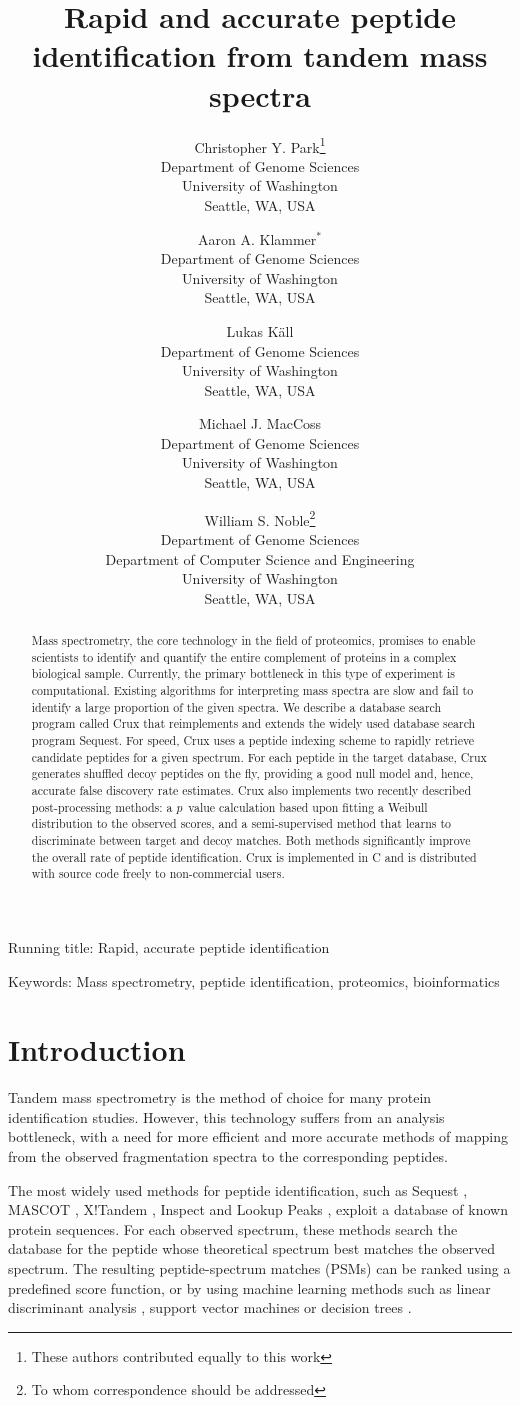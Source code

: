 \documentclass[12pt]{article}
\title{Rapid and accurate peptide identification from tandem mass spectra}
\author{Christopher Y. Park\footnote{These authors contributed equally 
to this work}\\
Department of Genome Sciences\\
University of Washington\\
Seattle, WA, USA
\and
Aaron A. Klammer$^*$\\
Department of Genome Sciences\\
University of Washington\\
Seattle, WA, USA
\and
Lukas K\"{a}ll\\
Department of Genome Sciences\\
University of Washington\\
Seattle, WA, USA
\and
Michael J. MacCoss\\
Department of Genome Sciences\\
University of Washington\\
Seattle, WA, USA
\and
William S. Noble\footnote{To whom correspondence should
  be addressed}\\
Department of Genome Sciences\\
Department of Computer Science and Engineering\\
University of Washington\\
Seattle, WA, USA
}
\begin{document}
\maketitle

\noindent Running title: {\sc Rapid, accurate peptide identification}

\noindent Keywords: Mass spectrometry, peptide identification, proteomics,
  bioinformatics

\clearpage

\begin{abstract}

\noindent
Mass spectrometry, the core technology in the field of proteomics,
promises to enable scientists to identify and quantify the entire
complement of proteins in a complex biological sample.  Currently, the
primary bottleneck in this type of experiment is computational.
Existing algorithms for interpreting mass spectra are slow and fail to
identify a large proportion of the given spectra.  We describe a
database search program called Crux that reimplements and extends the
widely used database search program {\sc Sequest}.  For speed, Crux
uses a peptide indexing scheme to rapidly retrieve candidate peptides
for a given spectrum.  For each peptide in the target database, Crux
generates shuffled decoy peptides on the fly, providing a good null
model and, hence, accurate false discovery rate estimates.  Crux also
implements two recently described post-processing methods: a $p$~value
calculation based upon fitting a Weibull distribution to the observed
scores, and a semi-supervised method that learns to discriminate
between target and decoy matches.  Both methods significantly improve
the overall rate of peptide identification.  Crux is implemented in C
and is distributed with source code freely to non-commercial users.
\end{abstract}

\clearpage

\section{Introduction}

Tandem mass spectrometry is the method of choice for many protein
identification studies.  However, this technology suffers from an
analysis bottleneck, with a need for more efficient and more accurate
methods of mapping from the observed fragmentation spectra to the
corresponding peptides.

The most widely used methods for peptide identification, such as {\sc
Sequest} \cite{eng:approach}, MASCOT \cite{perkins:probability},
X!Tandem \cite{craig:tandem}, Inspect \cite{tanner:inspect} and Lookup
Peaks \cite{bern:lookup}, exploit a database of known protein
sequences.  For each observed spectrum, these methods search the
database for the peptide whose theoretical spectrum best matches the
observed spectrum.  The resulting peptide-spectrum matches (PSMs) can
be ranked using a predefined score function, or by using machine
learning methods such as linear discriminant analysis
\cite{keller:empirical}, support vector machines \cite{anderson:new,
kall:semi-supervised} or decision trees \cite{elias:intensity}.
\end{document}
